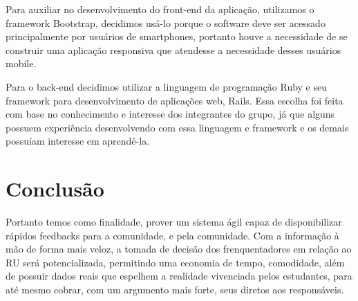 \documentclass[12pt]{article}
\begin{document}
Para auxiliar no desenvolvimento do front-end da aplicação, utilizamos o framework Bootstrap, 
decidimos usá-lo porque o software deve ser acessado principalmente por usuários de smartphones, 
portanto houve a necessidade de se construir uma aplicação responsiva que atendesse a necessidade 
desses usuários mobile.

Para o back-end decidimos utilizar a linguagem de programação Ruby e seu framework para 
desenvolvimento de aplicações web, Rails. Essa escolha foi feita com base no conhecimento e interesse
dos integrantes do grupo, já que alguns possuem experiência desenvolvendo com essa linguagem e framework e os demais possuíam interesse em aprendé-la.


\section{Conclusão}

Portanto temos como finalidade, prover um sistema ágil capaz de disponibilizar
rápidos feedbacks para a comunidade, e pela comunidade. Com a informação à mão de forma mais veloz, 
a tomada de decisão dos frenquentadores em relação ao RU será potencializada, permitindo uma
economia de tempo, comodidade, além de possuir dados reais que espelhem a realidade vivenciada
pelos estudantes, para até mesmo cobrar, com um argumento mais forte, seus diretos aos responsáveis.

%
%
%
%
%
\end{document}
